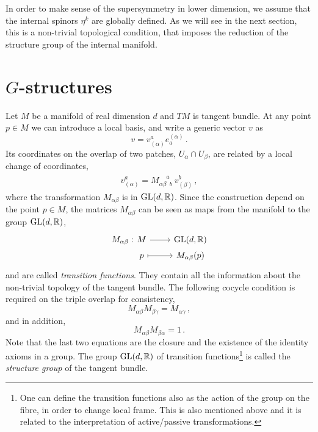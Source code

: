 \documentclass[debug]{phd}
\begin{document}
In order to make sense of the supersymmetry in lower dimension, we assume that the internal spinors $\eta^k$ are globally defined. 
As we will see in the next section, this is a non-trivial topological condition, that imposes the reduction of the structure group of the internal manifold.
		\section{\texorpdfstring{$G$-structures}{G-structures}}
			\label{gstruc}
					Let $M$ be a manifold of real dimension $d$ and $TM$ is tangent bundle. 
					At any point $p \in M$ we can introduce a local basis, and write a generic vector $v$ as
							\begin{equation}
								v = v^a_{(\alpha)} e_a^{(\alpha)}\, .
							\end{equation}
					Its coordinates on the overlap of two patches, $U_\alpha \cap U_\beta$, are related by a local change of coordinates,
							\begin{align}
								v^a_{(\alpha)} = M_{\alpha\beta\phantom{a} b}^{\phantom{\alpha \beta}a}\ v^b_{(\beta)}\, ,
							\end{align}
					where the transformation $M_{\alpha\beta}$ is in $\mathrm{GL}(d, \mathbb{R})$.
					Since the construction depend on the point $p \in M$, the matrices $M_{\alpha\beta}$ can be seen as maps from the manifold to the group $\mathrm{GL}(d, \mathbb{R})$,
							\begin{equation*}
								\begin{tikzcd}[row sep=.3mm]
									M_{\alpha \beta} :\!\!\!\!\!\!\!\!\!\!\!\!\!\!\!\!\! & M \arrow{r} & \GL(d, \mathbb{R}) \\
 									& p \arrow[mapsto]{r} & M_{\alpha \beta}(p)
								\end{tikzcd}
							\end{equation*}
					and are called \emph{transition functions}. 
					They contain all the information about the non-trivial topology of the tangent bundle.
					The following cocycle condition is required on the triple overlap for consistency,
							\begin{equation}
								M_{\alpha\beta} M_{\beta\gamma} = M_{\alpha\gamma}\, ,
							\end{equation}
					and in addition,
							\begin{equation}
								M_{\alpha\beta}M_{\beta\alpha} = 1\, .
							\end{equation}
					Note that the last two equations are the closure and the existence of the identity axioms in a group. 
					The group $\mathrm{GL}(d, \mathbb{R})$ of transition functions\footnote{%
					One can define the transition functions also as the action of the group on the fibre, in order to change local frame.
						This is also mentioned above and it is related to the interpretation of active/passive transformations.%
						} %
					is called the \emph{structure group} of the tangent bundle.
						
\end{document}
